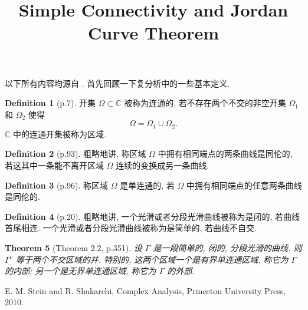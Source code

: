\documentclass[a4paper,11pt]{article}
\title{Simple Connectivity and Jordan Curve Theorem}
\newtheorem{theorem}{Theorem}[section]
\theoremstyle{definition}
\newtheorem{definition}[theorem]{Definition}
\begin{document}
\begin{CJK*}{UTF8}{gbsn}

\maketitle

以下所有内容均源自 \cite{ss10}. 首先回顾一下复分析中的一些基本定义.

\begin{definition}[p.7]
    开集 $ \Omega \subset \mathbb{C} $ 被称为连通的, 若不存在两个不交的非空开集 $ \Omega_1 $ 和 $ \Omega_2 $ 使得
    $$
        \Omega = \Omega_1 \cup \Omega_2.
    $$
    $ \mathbb{C} $ 中的连通开集被称为区域.
\end{definition}

\begin{definition}[p.93]
    粗略地讲, 
    称区域 $ \Omega $ 中拥有相同端点的两条曲线是同伦的, 若这其中一条能不离开区域 $ \Omega $ 连续的变换成另一条曲线.
\end{definition}

\begin{definition}[p.96]
    称区域 $ \Omega $ 是单连通的, 若 $ \Omega $ 中拥有相同端点的任意两条曲线是同伦的.
\end{definition}


\begin{definition}[p.20]
    粗略地讲, 
    一个光滑或者分段光滑曲线被称为是闭的, 若曲线首尾相连.    
    一个光滑或者分段光滑曲线被称为是简单的, 若曲线不自交.
\end{definition}

\begin{theorem}[Theorem 2.2, p.351]
    设 $ \Gamma $ 是一段简单的, 闭的, 分段光滑的曲线. 则 $ \Gamma^c $ 等于两个不交区域的并. 
    特别的, 这两个区域一个是有界单连通区域, 称它为 $ \Gamma $ 的内部;
    另一个是无界单连通区域, 称它为 $ \Gamma $ 的外部.
\end{theorem}

\begin{thebibliography}{99}

      E. M. Stein and R. Shakarchi, Complex Analysis, Princeton University Press, 2010.
    
\end{thebibliography}

\end{CJK*}
\end{document}
